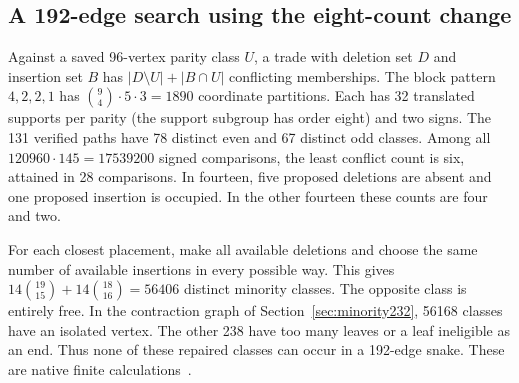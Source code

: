 \documentclass[11pt,a4paper]{article}
\theoremstyle{definition}
\theoremstyle{remark}
\begin{document}
\subsection{A 192-edge search using the eight-count change}
\label{sec:seedtrade242}
Against a saved 96-vertex parity class $U$, a trade with deletion set
$D$ and insertion set $B$ has $|D\setminus U|+|B\cap U|$ conflicting
memberships. The block pattern $4,2,2,1$ has
$\binom94\cdot5\cdot3=1890$ coordinate partitions. Each has 32
translated supports per parity (the support subgroup has order eight)
and two signs. The 131 verified paths have 78 distinct even and 67
distinct odd classes. Among all $120960\cdot145=17539200$ signed
comparisons, the least conflict count is six, attained in 28 comparisons.
In fourteen, five proposed deletions are absent and one proposed
insertion is occupied. In the other fourteen these counts are four and two.

For each closest placement, make all available deletions and choose the
same number of available insertions in every possible way. This gives
$14\binom{19}{15}+14\binom{18}{16}=56406$ distinct minority classes.
The opposite class is entirely free. In the contraction graph of
Section~\ref{sec:minority232}, 56168 classes have an isolated vertex.
The other 238 have too many leaves or a leaf ineligible as an end.
Thus none of these repaired classes can occur in a 192-edge snake.
These are native finite calculations~\cite{research242}.
\end{document}
